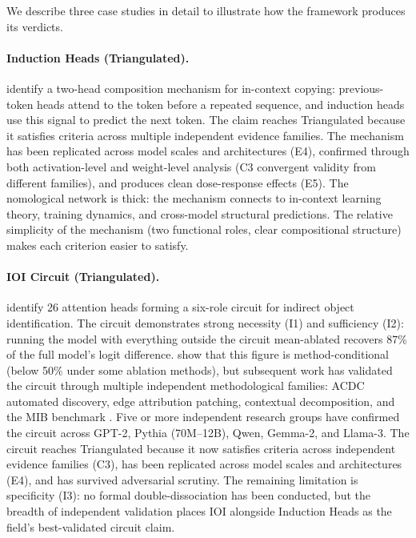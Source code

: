 \documentclass[10pt]{article}
\begin{document}
We describe three case studies in detail to illustrate how the framework produces its verdicts.

\paragraph{Induction Heads (Triangulated).} \citet{olsson2022context} identify a two-head composition mechanism for in-context copying: previous-token heads attend to the token before a repeated sequence, and induction heads use this signal to predict the next token. The claim reaches Triangulated because it satisfies criteria across multiple independent evidence families. The mechanism has been replicated across model scales and architectures (E4), confirmed through both activation-level and weight-level analysis (C3 convergent validity from different families), and produces clean dose-response effects (E5). The nomological network is thick: the mechanism connects to in-context learning theory, training dynamics, and cross-model structural predictions. The relative simplicity of the mechanism (two functional roles, clear compositional structure) makes each criterion easier to satisfy.

\paragraph{IOI Circuit (Triangulated).} \citet{wang2023interpretability} identify 26 attention heads forming a six-role circuit for indirect object identification. The circuit demonstrates strong necessity (I1) and sufficiency (I2): running the model with everything outside the circuit mean-ablated recovers 87\% of the full model's logit difference. \citet{miller2024transformer} show that this figure is method-conditional (below 50\% under some ablation methods), but subsequent work has validated the circuit through multiple independent methodological families: ACDC automated discovery, edge attribution patching, contextual decomposition, and the MIB benchmark \citep{mueller2025mib}. Five or more independent research groups have confirmed the circuit across GPT-2, Pythia (70M--12B), Qwen, Gemma-2, and Llama-3. The circuit reaches Triangulated because it now satisfies criteria across independent evidence families (C3), has been replicated across model scales and architectures (E4), and has survived adversarial scrutiny. The remaining limitation is specificity (I3): no formal double-dissociation has been conducted, but the breadth of independent validation places IOI alongside Induction Heads as the field's best-validated circuit claim.
\end{document}
